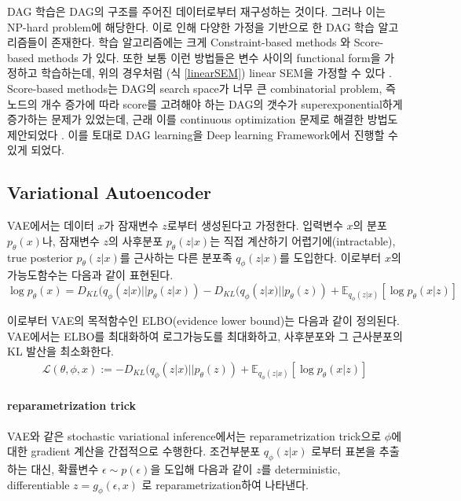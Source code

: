 \documentclass[10pt]{article}
\begin{document}
DAG 학습은 DAG의 구조를 주어진 데이터로부터 재구성하는 것이다. 그러나 이는 NP-hard problem에 해당한다. \cite{ChickeringNPhard} 이로 인해 다양한 가정을 기반으로 한 DAG 학습 알고리즘들이 존재한다. 학습 알고리즘에는 크게 Constraint-based methods \cite{Spirtes2000} 와 Score-based methods \cite{ChickeringGES} 가 있다. 또한 보통 이런 방법들은 변수 사이의 functional form을 가정하고 학습하는데, 위의 경우처럼 (식 \ref*{linearSEM}) linear SEM을 가정할 수 있다 \cite{GhoshalSEM}. Score-based methods는 DAG의 search space가 너무 큰 combinatorial problem, 즉 노드의 개수 증가에 따라 score를 고려해야 하는 DAG의 갯수가 superexponential하게 증가하는 문제가 있었는데, 근래 이를 continuous optimization 문제로 해결한 방법도 제안되었다 \cite{zheng2018dags}. 이를 토대로 DAG learning을 Deep learning Framework에서 진행할 수 있게 되었다.

\subsection{Variational Autoencoder}

VAE\cite{kingma2013auto}에서는 데이터 $x$가 잠재변수 $z$로부터 생성된다고 가정한다. 입력변수 $x$의 분포 $p_{\theta}(x)$나, 잠재변수 $z$의 사후분포 $p_{\theta}(z|x)$는 직접 계산하기 어렵기에(intractable), true posterior $p_{\theta}(z|x)$를 근사하는 다른 분포족 $q_{\phi}(z|x)$를 도입한다. 이로부터 $x$의 가능도함수는 다음과 같이 표현된다. \\

\begin{equation}
    \log p_{\theta}(x) = D_{KL}(q_{\phi}(z|x)||p_{\theta}(z|x)) -D_{KL}(q_{\phi}(z|x)||p_{\theta}(z)) + \mathbb{E}_{q_{\phi}(z|x)}[\log{p_{\theta}(x|z)}]
\end{equation}

이로부터 VAE의 목적함수인 ELBO(evidence lower bound)는 다음과 같이 정의된다. VAE에서는 ELBO를 최대화하여 로그가능도를 최대화하고, 사후분포와 그 근사분포의 KL 발산을 최소화한다.
\begin{eqnarray*}
\mathcal{L}(\theta,\phi, x) := -D_{KL}(q_{\phi}(z|x)||p_{\theta}(z)) + \mathbb{E}_{q_{\phi}(z|x)}[\log{p_{\theta}(x|z)}]
  \label{ELBO}
\end{eqnarray*}

\paragraph*{reparametrization trick}

VAE와 같은 stochastic variational inference에서는 reparametrization trick으로 \cite{reparametrization} $\phi$에 대한 gradient 계산을 간접적으로 수행한다. 조건부분포 $q_{\phi}(z|x)$ 로부터 표본을 추출하는 대신, 확률변수 $\epsilon \sim p(\epsilon)$을 도입해 다음과 같이 $z$를 deterministic, differentiable $z=g_{\phi}(\epsilon, x)$ 로 reparametrization하여 나타낸다.
\end{document}
